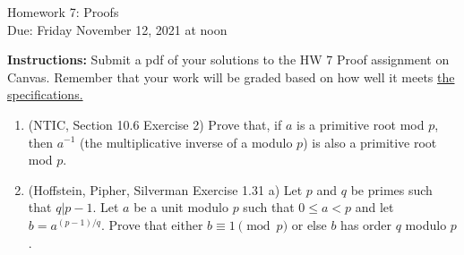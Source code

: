 \documentclass[10pt,a4paper]{article}
\begin{document}
\begin{center}
{\Large Homework 7: Proofs}\\
Due: Friday November 12, 2021 at noon\\


\end{center}
{\bf Instructions:} Submit a pdf of your solutions to the HW 7 Proof assignment on Canvas. Remember that your work will be graded based on how well it meets \href{https://docs.google.com/document/d/1emM06_WRh_h941rsjtRE9fRVndJtfRKd9gyS3Fs_rFA/edit?usp=sharing}{the specifications. }

\begin{enumerate}
\item (NTIC, Section 10.6 Exercise 2)  Prove that, if $a$ is a primitive root mod $p$, then $a^{-1}$ (the multiplicative inverse of a modulo $p$) is also a primitive root mod $p$. 
\item (Hoffstein,  Pipher,  Silverman Exercise 1.31 a) Let $p$ and $q$ be primes such that $q|p-1$.  Let $a$ be a unit modulo $p$ such that $0\le a<p$ and let $b = a^{(p-1)/q}$.  Prove that either $b \equiv 1\pmod{p}$ or else $b$ has order $q$ modulo $p$.

\end{enumerate}
\end{document}

